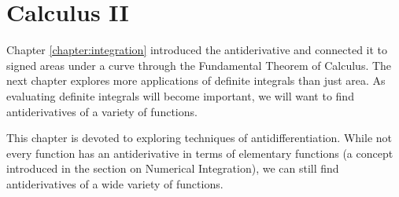 \part{Calculus II}


%
%
%



Chapter \ref{chapter:integration} introduced the antiderivative and connected it to signed areas under a curve through the Fundamental Theorem of Calculus. The next chapter explores more applications of definite integrals than just area. As evaluating definite integrals will become important, we will want to find antiderivatives of a variety of functions.

This chapter is devoted to exploring techniques of antidifferentiation. While not every function has an antiderivative in terms of elementary functions (a concept introduced in the section on Numerical Integration), we can still find antiderivatives of a wide variety of functions.





















